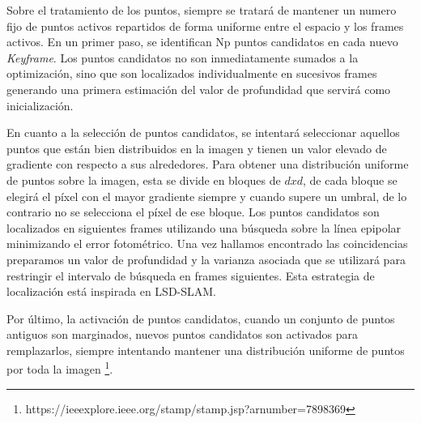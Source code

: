 Sobre el tratamiento de los puntos, siempre se tratará de mantener un numero fijo de puntos activos repartidos de forma uniforme entre el espacio y los frames activos. En un primer paso, se identifican Np puntos candidatos en cada nuevo \textit{Keyframe}. Los puntos candidatos no son inmediatamente sumados a la optimización, sino que son localizados individualmente en sucesivos frames generando una primera estimación del valor de profundidad que servirá como inicialización. 

En cuanto a la selección de puntos candidatos, se intentará seleccionar aquellos puntos que están bien distribuidos en la imagen y tienen un valor elevado de gradiente con respecto a sus alrededores. Para obtener una distribución uniforme de puntos sobre la imagen, esta se divide en bloques de $dxd$, de cada bloque se elegirá el píxel con el mayor gradiente siempre y cuando supere un umbral, de lo contrario no se selecciona el píxel de ese bloque. Los puntos candidatos son localizados en siguientes frames utilizando una búsqueda sobre la línea epipolar minimizando el error fotométrico. Una vez hallamos encontrado las coincidencias preparamos un valor de profundidad y la varianza asociada que se utilizará para restringir el intervalo de búsqueda en frames siguientes. Esta estrategia de localización está inspirada en LSD-SLAM.

Por último, la activación de puntos candidatos, cuando un conjunto de puntos antiguos son marginados, nuevos puntos candidatos son activados para remplazarlos, siempre intentando mantener una distribución uniforme de puntos por toda la imagen \footnote{https://ieeexplore.ieee.org/stamp/stamp.jsp?arnumber=7898369}.

